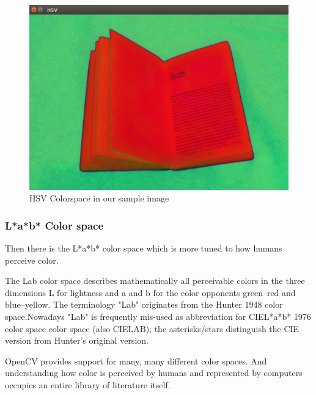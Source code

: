 \documentclass[BTech]{srmuthesis}
\begin{document}
\begin{figure}[!hb]
    \centering
    \includegraphics[width=15cm\textwidth]{hsv_colorspace}
    \caption{HSV Colorspace in our sample image}
    \label{fig:HSV Cube}
\end{figure}

\subsubsection{L*a*b* Color space}

Then there is the L*a*b* color space which is more tuned to how humans perceive color.

The Lab color space describes mathematically all perceivable colors in the three dimensions L for lightness and a and b for the color opponents green–red and blue–yellow. The terminology "Lab" originates from the Hunter 1948 color space.Nowadays "Lab" is frequently mis-used as abbreviation for CIEL*a*b* 1976 color space color space (also CIELAB); the asterisks/stars distinguish the CIE version from Hunter's original version. 

\newpage

OpenCV provides support for many, many different color spaces. And understanding how color is perceived by humans and represented by computers occupies an entire library of literature itself.
\end{document}
